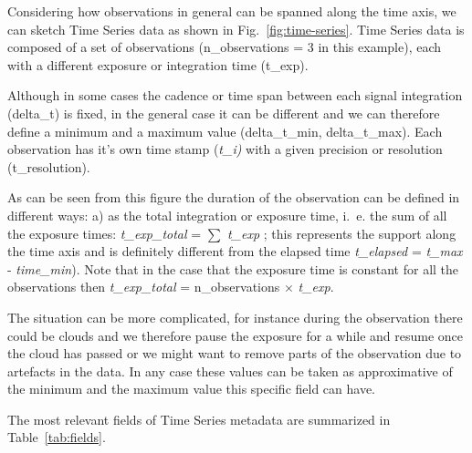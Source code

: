 \documentclass[11pt,a4paper]{ivoa}
\begin{document}
Considering how observations in general can be spanned along the time axis, we can sketch Time Series data as shown in Fig.~\ref{fig:time-series}. Time Series data is composed of a set of observations (n\_observations = 3 in this example), each with a different exposure or integration time (t\_exp).

Although in some cases the cadence or time span between each signal integration (delta\_t) is fixed, in the general case it can be different and we can therefore define a minimum and a maximum value (delta\_t\_min, delta\_t\_max). Each observation has it's own time stamp (\emph{t\_i)} with a given precision or resolution (t\_resolution).

As can be seen from this figure the duration of the observation can be defined in different ways: a) as the total integration or exposure time, i.~e. the sum of all the exposure times: \emph{t\_exp\_total }= $\sum$ \emph{t\_exp} ; this represents the support along the time axis and is definitely different from  the elapsed time  \emph{t\_elapsed} = \emph{t\_max} - \emph{time\_min}). Note that in the case that the exposure time is constant for all the observations then \emph{t\_exp\_total }= n\_observations $\times$ \emph{t\_exp}.

The situation can be more complicated, for instance during the observation there could be clouds and we therefore pause the exposure for a while and resume once the cloud has passed or we might want to remove parts of the observation due to artefacts in the data. In any case these values can be taken as approximative of the minimum and the maximum value this specific field can have.

The most relevant fields of Time Series metadata are summarized in Table~\ref{tab:fields}.
\end{document}
